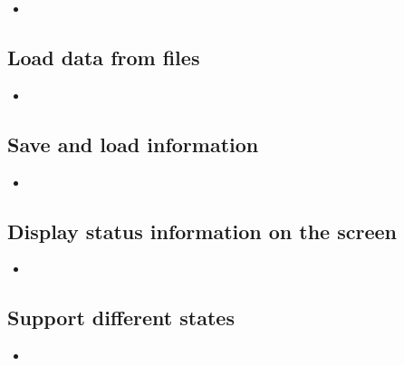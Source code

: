 \begin{itemize}
	\item
\end{itemize}

\subsection{Load data from files}

\begin{itemize}
	\item
\end{itemize}

\subsection{Save and load information}

\begin{itemize}
	\item
\end{itemize}

\subsection{Display status information on the screen}

\begin{itemize}
	\item
\end{itemize}

\subsection{Support different states}

\begin{itemize}
	\item
\end{itemize}